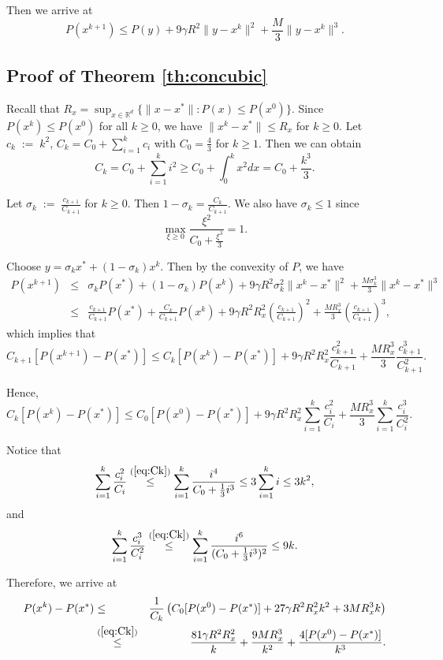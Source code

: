 \documentclass[12pt]{article}
\newcommand{\eqdef}{\; { := }\;}
\newcommand{\R}{\mathbb{R}}
\begin{document}
Then we arrive at 
$$
P(x^{k+1}) \leq P(y) + 9\gamma R^2 \|y-x^k\|^2 + \frac{M}{3}\|y-x^k\|^3. 
$$


\subsection{Proof of Theorem \ref{th:concubic}}

Recall that $R_x =\sup_{x\in \R^d} \{  \|x-x^*\| : P(x) \leq P(x^0)  \}$. Since $P(x^k) \leq P(x^0)$ for all $k\geq 0$, we have $\|x^k - x^*\| \leq R_x$ for $k\geq 0$.  Let $c_k \eqdef k^2$, $C_k = C_0 + \sum_{i=1}^kc_i$ with $C_0=\frac{4}{3}$ for $k\geq 1$. Then we can obtain  
\begin{equation}\label{eq:Ck}
C_k = C_0 + \sum_{i=1}^k i^2 \geq C_0 + \int_{0}^k x^2 dx = C_0 + \frac{k^3}{3}. 
\end{equation}

Let $\sigma_k \eqdef \frac{c_{k+1}}{C_{k+1}}$ for $k\geq 0$. Then $1 - \sigma_k = \frac{C_k}{C_{k+1}}$. We also have $\sigma_k \leq 1$ since 
$$
\max_{\xi\geq 0} \frac{\xi^2}{C_0 + \frac{\xi^3}{3}} =1. 
$$

Choose $y = \sigma_k x^* + (1-\sigma_k)x^k$. Then by the convexity of $P$, we have 
\begin{eqnarray*}
	P(x^{k+1}) &\leq& \sigma_k P(x^*) + (1-\sigma_k) P(x^k) + 9\gamma R^2 \sigma_k^2 \|x^k - x^*\|^2 + \frac{M \sigma_k^3}{3}\|x^k-x^*\|^3 \\ 
	&\leq& \frac{c_{k+1}}{C_{k+1}}P(x^*) + \frac{C_k}{C_{k+1}}P(x^k) + 9\gamma R^2R_x^2 \left(  \frac{c_{k+1}}{C_{k+1}}  \right)^2 + \frac{MR_x^3}{3} \left(  \frac{c_{k+1}}{C_{k+1}}  \right)^3, 
\end{eqnarray*}
which implies that 
$$
C_{k+1} [P(x^{k+1}) - P(x^*)] \leq C_k [P(x^k) - P(x^*)] + 9\gamma R^2R_x^2 \frac{c_{k+1}^2}{C_{k+1}} + \frac{MR_x^3}{3} \frac{c_{k+1}^3}{C_{k+1}^2}. 
$$

Hence, 
$$
C_k[P(x^k) - P(x^*)] \leq C_0[P(x^0) - P(x^*)] + 9\gamma R^2R_x^2 \sum_{i=1}^k \frac{c_i^2}{C_i} + \frac{MR_x^3}{3} \sum_{i=1}^k \frac{c_i^3}{C_i^2}. 
$$

Notice that 
$$
\sum_{i=1}^k \frac{c_i^2}{C_i} \overset{(\ref{eq:Ck})}{\leq} \sum_{i=1}^k \frac{i^4}{C_0 + \frac{1}{3}i^3}\leq 3 \sum_{i=1}^k i \leq 3k^2, 
$$
and 
$$
\sum_{i=1}^k \frac{c_i^3}{C_i^2}  \overset{(\ref{eq:Ck})}{\leq}  \sum_{i=1}^k \frac{i^6}{(C_0 + \frac{1}{3}i^3)^2} \leq 9k. 
$$

Therefore, we arrive at 
\begin{eqnarray*}
	P(x^k) - P(x^*) &\leq& \frac{1}{C_k} \left(  C_0[P(x^0) - P(x^*)] + 27\gamma R^2R_x^2 k^2 + 3MR_x^3 k \right) \\ 
	&\overset{(\ref{eq:Ck})}{\leq}& \frac{81\gamma R^2 R_x^2}{k} + \frac{9MR_x^3}{k^2} + \frac{4[P(x^0) - P(x^*)]}{k^3}. 
\end{eqnarray*}
\end{document}
